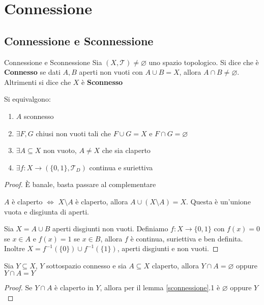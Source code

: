 \documentclass[11pt,a4paper,twoside]{article}
\theoremstyle{definition}
\begin{document}
\newpage

\section{Connessione}

\subsection{Connessione e Sconnessione}

\begin{defn}{Connessione e Sconnessione}{}
	Sia $(X, \mathcal T)\neq \varnothing$ uno spazio topologico. Si dice che è \textbf{Connesso} se dati $A,B$ aperti non vuoti con $A \cup B = X$, allora $A \cap B \neq \varnothing$. Altrimenti si dice che $X$ è \textbf{Sconnesso}
\end{defn}

\begin{lemma}{}{}\label{sconnessione}
	Si equivalgono:
	\begin{enumerate}
		\item $A$ sconnesso
		\item $\exists F, G$ chiusi non vuoti tali che $F \cup G = X$ e $F \cap G = \varnothing$
		\item $\exists A \subseteq X$ non vuoto, $A \neq X$ che sia claperto
		\item $\exists f:X \to (\{0,1\}, \mathcal T_D)$ continua e suriettiva
	\end{enumerate}
\end{lemma}
\begin{proof}
	 È banale, basta passare al complementare

	 $A$ è claperto $\Leftrightarrow$ $X\setminus A$ è claperto, allora $A \cup (X\setminus A) = X$. Questa è un'unione vuota e disgiunta di aperti.

	 Sia $X = A \cup B$ aperti disgiunti non vuoti. Definiamo $f:X \to \{0,1\}$ con $f(x) = 0$ se $x \in A$ e $f(x) = 1$ se $x \in B$, allora $f$ è continua, suriettiva e ben definita. Inoltre $X = f^{-1}(\{0\})\cup f^{-1}(\{1\})$, aperti disgiunti e non vuoti.
\end{proof}

\begin{lemma}{}{}
	Sia $Y \subseteq X$, $Y$ sottospazio connesso e sia $A\subseteq X$ claperto, allora $Y\cap A = \varnothing$ oppure $Y \cap A = Y$
\end{lemma}
\begin{proof}
	Se $Y \cap A$ è claperto in $Y$, allora per il lemma \ref{sconnessione}.1 è $\varnothing$ oppure $Y$
\end{proof}
\end{document}
